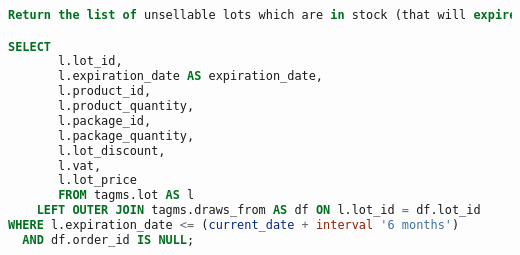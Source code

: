 \begin{lstlisting}[language=SQL,
keywordstyle=\color{blue},
stringstyle=\color{mauve},
showstringspaces=false,
basicstyle=\ttfamily\footnotesize]
Return the list of unsellable lots which are in stock (that will expire in less than 6 months)

SELECT
       l.lot_id,
       l.expiration_date AS expiration_date,
       l.product_id,
       l.product_quantity,
       l.package_id,
       l.package_quantity,
       l.lot_discount,
       l.vat,
       l.lot_price
       FROM tagms.lot AS l
    LEFT OUTER JOIN tagms.draws_from AS df ON l.lot_id = df.lot_id
WHERE l.expiration_date <= (current_date + interval '6 months')
  AND df.order_id IS NULL;

\end{lstlisting}

